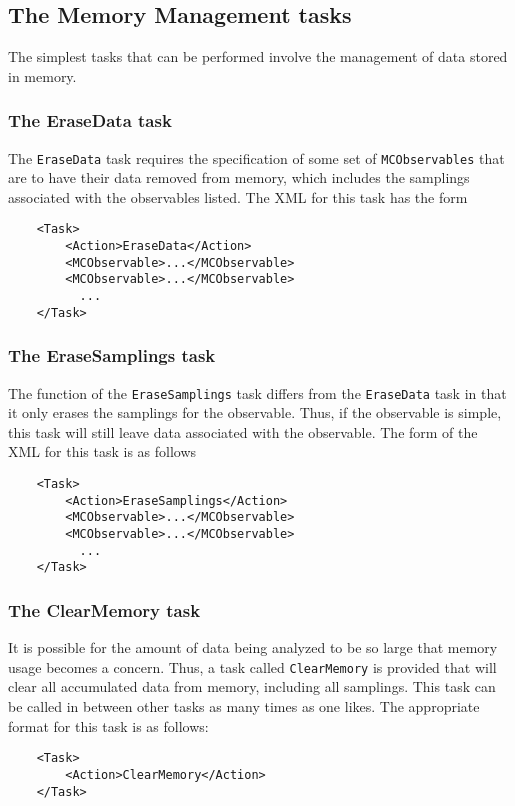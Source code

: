 \documentclass[12pt]{article}
\newcommand{\vb}{\texttt}
\begin{document}
\subsection{The Memory Management tasks}

The simplest tasks that can be performed involve the management
of data stored in memory.

\subsubsection{The EraseData task}

The \vb{EraseData} task requires the specification of some set
of \vb{MCObservables} that are to have their data removed
from memory, which includes the samplings associated with
the observables listed. The XML for this task has the form
\begin{verbatim}
    <Task>
        <Action>EraseData</Action>
        <MCObservable>...</MCObservable> 
        <MCObservable>...</MCObservable>
          ...
    </Task>
\end{verbatim}

\subsubsection{The EraseSamplings task}

The function of the \vb{EraseSamplings} task differs from the
\vb{EraseData} task in that it only erases the samplings for
the observable. Thus, if the observable is simple, this task
will still leave data associated with the observable. The form
of the XML for this task is as follows
\begin{verbatim}
    <Task>
        <Action>EraseSamplings</Action>
        <MCObservable>...</MCObservable> 
        <MCObservable>...</MCObservable>
          ...
    </Task>
\end{verbatim}

\subsubsection{The ClearMemory task}

It is possible
for the amount of data being analyzed to be so large that memory usage
becomes a concern. Thus, a task called \vb{ClearMemory} is
provided that will clear all accumulated data from memory, including
all samplings. This task can be called
in between other tasks as many times as one likes.
The appropriate format for
this task is as follows:
\begin{verbatim}
    <Task>
        <Action>ClearMemory</Action>
    </Task>
\end{verbatim}
\end{document}
